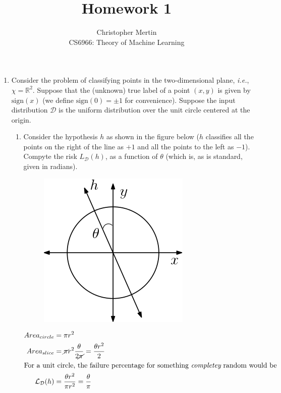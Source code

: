 \documentclass[12pt]{article}
\newcommand{\sign}[1]{\text{sign}(#1)}
\begin{document}
 
 
\title{Homework 1}%
\author{Christopher Mertin\\ %
CS6966: Theory of Machine Learning} %
 
\maketitle

\begin{enumerate}
\item Consider the problem of classifying points in the two-dimensional plane, {\em i.e.}, $\chi = \mathbb{R}^{2}$. Suppose that the (unknown) true label of a point $(x,y)$ is given by $\sign{x}$ (we define $\sign{0} = \pm 1$ for convenience). Suppose the input distribution $\mathcal{D}$ is the uniform distribution over the unit circle centered at the origin.

\begin{enumerate}
\item Consider the hypothesis $h$ as shown in the figure below ($h$ classifies all the points on the right of the line as $+1$ and all the points to the left as $-1$). Compyte the risk $L_{\mathcal{D}}(h)$, as a function of $\theta$ (which is, as is standard, given in radians). 

\begin{figure}[H]
\centering
\includegraphics[width=.25\textwidth]{hw1_fig1.png}
\end{figure}

\begin{align*}
Area_{circle} &= \pi r^{2}\\
Area_{slice} &= \cancel{\pi} r^{2} \frac{\theta}{2\cancel{\pi}} = \frac{\theta r^{2}}{2}\\
\intertext{For a unit circle, the failure percentage for something {\em completey} random would be}
\mathcal{L}_{\mathcal{D}}(h) &= \frac{\theta r^{2}}{\pi r^{2}} = \frac{\theta}{\pi}
\end{align*}


\end{enumerate}
\end{enumerate}
\end{document}
